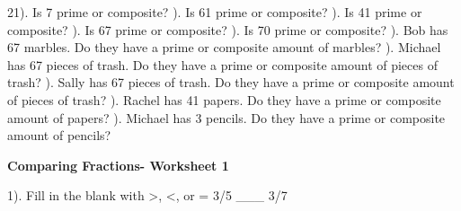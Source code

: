 \documentclass{article}%
\begin{document}
21). Is 7 prime or composite?%
\newline%
\newline%
). Is 61 prime or composite?%
\newline%
\newline%
). Is 41 prime or composite?%
\newline%
\newline%
). Is 67 prime or composite?%
\newline%
\newline%
). Is 70 prime or composite?%
\newline%
\newline%
). Bob has 67 marbles. Do they have a prime or composite amount of marbles?%
\newline%
\newline%
). Michael has 67 pieces of trash. Do they have a prime or composite amount of pieces of trash?%
\newline%
\newline%
). Sally has 67 pieces of trash. Do they have a prime or composite amount of pieces of trash?%
\newline%
\newline%
). Rachel has 41 papers. Do they have a prime or composite amount of papers?%
\newline%
\newline%
). Michael has 3 pencils. Do they have a prime or composite amount of pencils?%
\newline%
\newline%
\newline%
\pagebreak%
\large%
\begin{center}%
\textbf{Comparing Fractions- Worksheet 1}%
\newline%
\newline%
\newline%
\end{center} \normalsize%
1). Fill in the blank with >, <, or = 3/5 \_\_\_ 3/7%
\newline%
\newline%
\newline%
\end{document}
